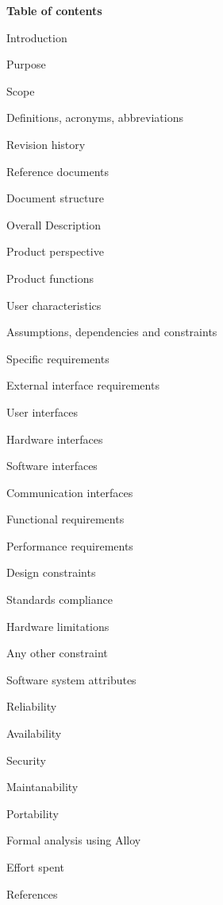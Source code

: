 \documentclass{article}
\begin{document}
\newpage
\textbf{Table of contents}
	\begin{legal}
 	\item Introduction
  		\begin{legal}
    		\item Purpose
		\item Scope
		\item Definitions, acronyms, abbreviations
		\item Revision history
		\item Reference documents
		\item Document structure	
  		\end{legal}
	\item Overall Description
  		\begin{legal}
    		\item Product perspective
		\item Product functions
		\item User characteristics
		\item Assumptions, dependencies and constraints
  		\end{legal}
	\item Specific requirements
  		\begin{legal}
    		\item External interface requirements
			\begin{legal}
			\item User interfaces
			\item Hardware interfaces
			\item Software interfaces
			\item Communication interfaces
	  		\end{legal}
		\item Functional requirements
		\item Performance requirements
		\item Design constraints
			\begin{legal}
			\item Standards compliance
			\item Hardware limitations
			\item Any other constraint
  			\end{legal}
		\item Software system attributes
			\begin{legal}
			\item Reliability
			\item Availability
			\item Security
			\item Maintanability
			\item Portability
  			\end{legal}
  		\end{legal}
	\item Formal analysis using Alloy
  	\item Effort spent
	\item References
	\end{legal}
\end{document}
